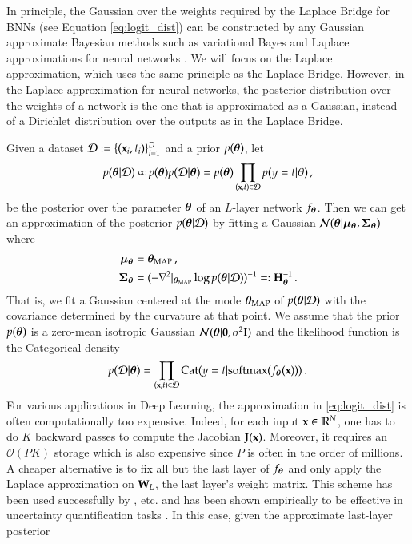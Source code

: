 
In principle, the Gaussian over the weights required by the Laplace Bridge for BNNs (see Equation \ref{eq:logit_dist}) can be constructed by any Gaussian approximate Bayesian methods such as variational Bayes \citep{Graves2011VB,Blundell2015WeightUI} and Laplace approximations for neural networks \citep{MacKay1992,ritter2018a}. We will focus on the Laplace approximation, which uses the same principle as the Laplace Bridge. However, in the Laplace approximation for neural networks, the posterior distribution over the weights of a network is the one that is approximated as a Gaussian, instead of a Dirichlet distribution over the outputs as in the Laplace Bridge.

Given a dataset $\mathcal{D} := \{ (\mathbf{x}_i, t_i) \}_{i=1}^D$ and a prior $p({\boldsymbol{\theta}})$, let
%
\begin{equation}
    p({\boldsymbol{\theta}} | \mathcal{D}) \propto p({\boldsymbol{\theta}}) p(\mathcal{D} | {\boldsymbol{\theta}}) = p({\boldsymbol{\theta}}) \prod_{(\mathbf{x}, t) \in \mathcal{D}} p(y = t | \theta) \, ,
\end{equation}
%
be the posterior over the parameter ${\boldsymbol{\theta}}$ of an $L$-layer network $f_{\boldsymbol{\theta}}$. Then we can get an approximation of the posterior $p({\boldsymbol{\theta}} | \mathcal{D})$ by fitting a Gaussian $\mathcal{N}({\boldsymbol{\theta}} | {\boldsymbol{\mu}}_{\boldsymbol{\theta}}, {\boldsymbol{\Sigma}}_{\boldsymbol{\theta}})$ where
%
\begin{align*}
    {\boldsymbol{\mu}}_{\boldsymbol{\theta}} &= {\boldsymbol{\theta}}_\text{MAP} \, , \\
    {\boldsymbol{\Sigma}}_{\boldsymbol{\theta}} &= (-\nabla^2 \vert_{{\boldsymbol{\theta}}_\text{MAP}} \log p({\boldsymbol{\theta}} | \mathcal{D}))^{-1} =: {\mathbf{H}}_{\boldsymbol{\theta}}^{-1} \, .
\end{align*}
%
That is, we fit a Gaussian centered at the mode ${\boldsymbol{\theta}}_\text{MAP}$ of $p({\boldsymbol{\theta}} | \mathcal{D})$ with the covariance determined by the curvature at that point. We assume that the prior $p({\boldsymbol{\theta}})$ is a zero-mean isotropic Gaussian $\mathcal{N}({\boldsymbol{\theta}} | \mathbf{0}, \sigma^2 {\mathbf{I}})$ and the likelihood function is the Categorical density
%
\begin{equation*}
    p(\mathcal{D} | {\boldsymbol{\theta}}) = \prod_{(\mathbf{x}, t) \in \mathcal{D}} \mathrm{Cat}(y = t | \mathrm{softmax}(f_{\boldsymbol{\theta}}(\mathbf{x}))) \, .
\end{equation*}
%
For various applications in Deep Learning, the approximation in \eqref{eq:logit_dist} is often computationally too expensive. Indeed, for each input $\mathbf{x} \in \mathbb{R}^N$, one has to do $K$ backward passes to compute the Jacobian ${\mathbf{J}}(\mathbf{x})$. Moreover, it requires an $\mathcal{O}(PK)$ storage which is also expensive since $P$ is often in the order of millions. A cheaper alternative is to fix all but the last layer of $f_{\boldsymbol{\theta}}$ and only apply the Laplace approximation on ${\mathbf{W}}_L$, the last layer's weight matrix. This scheme has been used successfully by \citet{ScalableBayesianOptimizationDNNs2015,2016DeepKernelLearning}, etc. and has been shown empirically to be effective in uncertainty quantification tasks \citep{brosse2020last}. In this case, given the approximate last-layer posterior

